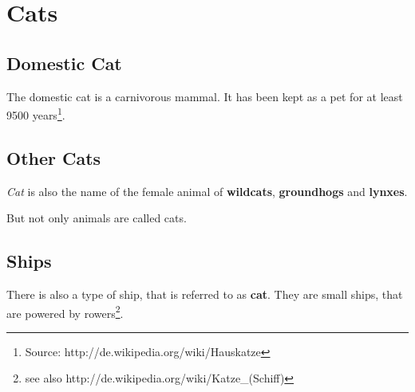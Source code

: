 \documentclass[a4paper, pdftex, ngerman, 12pt]{article}
\begin{document}
\section{Cats}
\subsection{Domestic Cat}
The domestic cat is a carnivorous mammal. It has been kept as a pet for at least 9500 years\footnote{Source: http://de.wikipedia.org/wiki/Hauskatze}.
\subsection{Other Cats}
\textit{Cat} is also the name of the female animal of \textbf{wildcats}, \textbf{groundhogs} and \textbf{lynxes}.

But not only animals are called cats.
\subsection{Ships}
There is also a type of ship, that is referred to as \textbf{cat}. They are \tiny small \normalsize ships, that are powered by rowers\footnote{see also http://de.wikipedia.org/wiki/Katze\_(Schiff)}.
\end{document}
